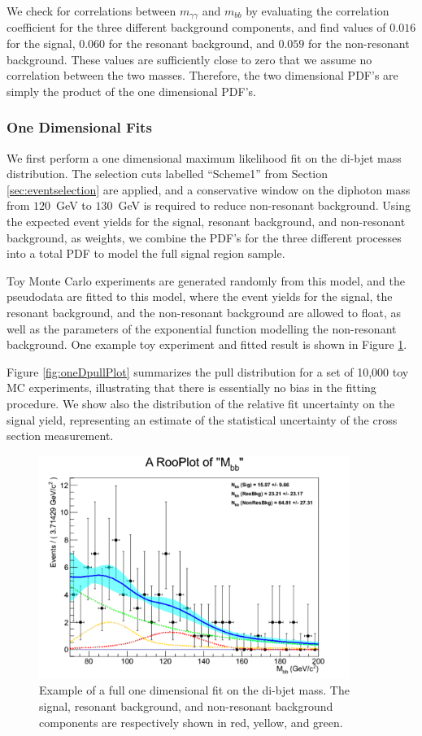 \documentclass{cmspaper}
\begin{document}
We check for correlations between $m_{\gamma\gamma}$ and $m_{bb}$ by evaluating the correlation coefficient
for the three different background components, and find values of $0.016$ for the signal, 
$0.060$ for the resonant background, and $0.059$ for the non-resonant background. These values are sufficiently
close to zero that we assume no correlation between the two masses. Therefore, the two 
dimensional PDF's are simply the product of the one dimensional PDF's.


\subsubsection{One Dimensional Fits}
We first perform a one dimensional maximum likelihood fit on the di-bjet mass distribution. 
The selection cuts labelled ``Scheme1'' from Section \ref{sec:eventselection} are applied, and a conservative
window on the diphoton mass from $120$~GeV to $130$~GeV is required to reduce non-resonant background. 
Using the expected event yields for the signal, resonant background, and non-resonant background, as
weights, we combine the PDF's for the three different processes into a total PDF to model the full
signal region sample.

Toy Monte Carlo experiments are generated randomly from this model, and the pseudodata are fitted
to this model, where the event yields for the signal, the resonant background, and the non-resonant
background are allowed to float, as well as the parameters of the exponential function modelling
the non-resonant background. One example toy experiment and fitted result is shown in 
Figure \ref{fig:oneDfullFit}. 

Figure \ref{fig:oneDpullPlot} summarizes the pull distribution for a set of 10,000 toy MC experiments,
illustrating that there is essentially no bias in the fitting procedure. We show also the
distribution of the relative fit uncertainty on the signal yield, representing an estimate of the
statistical uncertainty of the cross section measurement. 

\begin{figure}[h]
  \centering
  \includegraphics[width=0.9\textwidth]{figures/oneDimFitPhoWin_0.pdf}
  \caption{Example of a full one dimensional fit on the di-bjet mass. The signal, resonant background, and non-resonant background components are respectively shown in red, yellow, and green.}
  \label{fig:oneDfullFit}
\end{figure}
\end{document}
